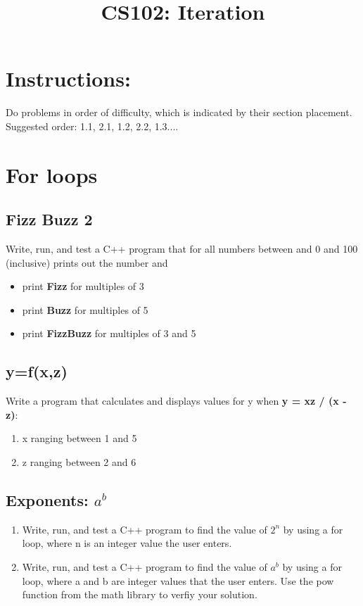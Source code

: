 \documentclass{article}
\begin{document}
\title{CS102: Iteration}

\maketitle
\section*{Instructions:}
Do problems in order of difficulty, which is indicated by their section placement. Suggested order: 1.1, 2.1, 1.2, 2.2, 1.3....
\section{For loops}
\subsection{Fizz Buzz 2}
Write, run, and test a C++ program that for all numbers between and 0 and 100 (inclusive) prints out the number and
\begin{itemize}
	\item print \textbf{Fizz} for multiples of 3
	\item print \textbf{Buzz} for multiples of 5
	\item print \textbf{FizzBuzz} for multiples of 3 and 5
\end{itemize}

\subsection{y=f(x,z)}
Write a program that calculates and displays values for y when \textbf{y = xz / (x - z)}:

\begin{enumerate}
 	\item x ranging between 1 and 5
	\item z ranging between 2 and 6
\end{enumerate}

\subsection{Exponents: $a^{b}$}
\begin{enumerate}
	\item Write, run, and test a C++ program to find the value of $2^{n}$ by using a for loop, where n is an integer value the user
enters.
	\item Write, run, and test a C++ program to find the value of $a^{b}$  by using a for loop, where a and b are integer values that the user enters. Use the pow function from the math library to verfiy your solution.
\end{enumerate}
\end{document}
